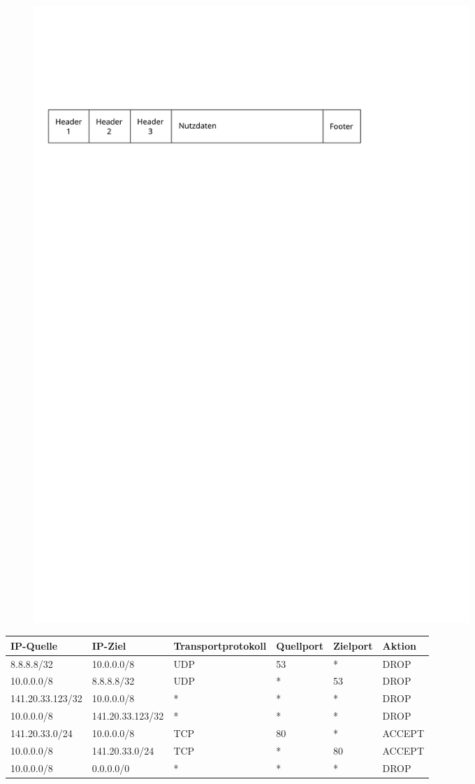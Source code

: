 \documentclass[xcolor=x11names,compress]{beamer}
\renewcommand{\(}{\begin{columns}}
\renewcommand{\)}{\end{columns}}
\newcommand{\<}[1]{\begin{column}{#1}}
\renewcommand{\>}{\end{column}}
\begin{document}
\begin{frame}
  \begin{figure}
  \centering
  \includegraphics[width=0.8\textwidth]{figures/paketheader}
  \end{figure}
  \pause
  \tiny
  \begin{table}
  \begin{tabularx}{\textwidth}{XXXXX|X}
    IP-Quelle&IP-Ziel&Transport\-protokoll&Quellport&Zielport&Aktion\\
    \hline
    8.8.8.8/32&10.0.0.0/8&UDP&53&*&\textsc{DROP}\\
    10.0.0.0/8&8.8.8.8/32&UDP&*&53&\textsc{DROP}\\
    141.20.33.123/32&10.0.0.0/8&*&*&*&\textsc{DROP}\\
    10.0.0.0/8&141.20.33.123/32&*&*&*&\textsc{DROP}\\
    141.20.33.0/24&10.0.0.0/8&TCP&80&*&\textsc{ACCEPT}\\
    10.0.0.0/8&141.20.33.0/24&TCP&*&80&\textsc{ACCEPT}\\
    10.0.0.0/8&0.0.0.0/0&*&*&*&\textsc{DROP}
  \end{tabularx}
  \end{table}
  \normalsize
\end{frame}
\end{document}
